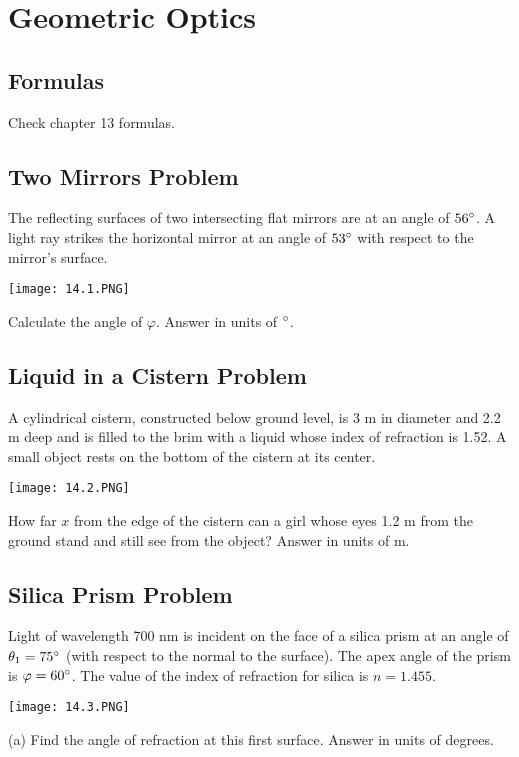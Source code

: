 \documentclass[../physics12.tex]{subfiles}
\begin{document}
\chapter{Geometric Optics}
\section{Formulas}
Check chapter 13 formulas.

\section{Two Mirrors Problem}
The reflecting surfaces of two intersecting flat mirrors are at an angle of $56\degree$. A light ray strikes the horizontal mirror at an angle of $53\degree$ with respect to the mirror's surface.
\begin{center}
    \texttt{[image: 14.1.PNG]}
\end{center}
Calculate the angle of $\varphi$. Answer in units of $\degree$.

\section{Liquid in a Cistern Problem}
A cylindrical cistern, constructed below ground level, is 3 m in diameter and 2.2 m deep and is filled to the brim with a liquid whose index of refraction is 1.52. A small object rests on the bottom of the cistern at its center.
\begin{center}
    \texttt{[image: 14.2.PNG]}
\end{center}
How far $x$ from the edge of the cistern can a girl whose eyes 1.2 m from the ground stand and still see from the object? Answer in units of m.

\section{Silica Prism Problem}
Light of wavelength 700 nm is incident on the face of a silica prism at an angle of $\theta_1 = 75\degree$ (with respect to the normal to the surface).
The apex angle of the prism is $\varphi = 60\degree$. The value of the index of refraction for silica is $n=1.455$.
\begin{center}
    \texttt{[image: 14.3.PNG]}
\end{center}
(a) Find the angle of refraction at this first surface. Answer in units of degrees.
\end{document}
